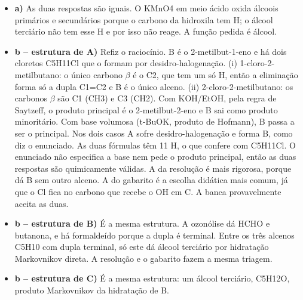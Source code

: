 \documentclass{article}%
\begin{document}
\begin{itemize}%
\item%
\textbf{a)} As duas respostas são iguais. O KMnO4 em meio ácido oxida álcoois primários e secundários porque o carbono da hidroxila tem H; o álcool terciário não tem esse H e por isso não reage. A função pedida é álcool.%
\item%
\textbf{b -- estrutura de A)} Refiz o raciocínio. B é o 2{-}metilbut{-}1{-}eno e há dois cloretos C5H11Cl que o formam por desidro{-}halogenação. (i) 1{-}cloro{-}2{-}metilbutano: o único carbono $\beta$ é o C2, que tem um só H, então a eliminação forma só a dupla C1=C2 e B é o único alceno. (ii) 2{-}cloro{-}2{-}metilbutano: os carbonos $\beta$ são C1 (CH3) e C3 (CH2). Com KOH/EtOH, pela regra de Saytzeff, o produto principal é o 2{-}metilbut{-}2{-}eno e B sai como produto minoritário. Com base volumosa (t{-}BuOK, produto de Hofmann), B passa a ser o principal. Nos dois casos A sofre desidro{-}halogenação e forma B, como diz o enunciado. As duas fórmulas têm 11 H, o que confere com C5H11Cl. O enunciado não especifica a base nem pede o produto principal, então as duas respostas são quimicamente válidas. A da resolução é mais rigorosa, porque dá B sem outro alceno. A do gabarito é a escolha didática mais comum, já que o Cl fica no carbono que recebe o OH em C. A banca provavelmente aceita as duas.%
\item%
\textbf{b -- estrutura de B)} É a mesma estrutura. A ozonólise dá HCHO e butanona, e há formaldeído porque a dupla é terminal. Entre os três alcenos C5H10 com dupla terminal, só este dá álcool terciário por hidratação Markovnikov direta. A resolução e o gabarito fazem a mesma triagem.%
\item%
\textbf{b -- estrutura de C)} É a mesma estrutura: um álcool terciário, C5H12O, produto Markovnikov da hidratação de B.%
\end{itemize}%
\end{document}
